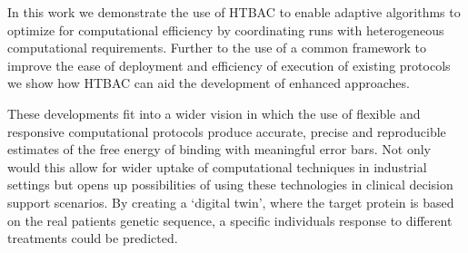 

In this work we demonstrate the use of HTBAC to enable adaptive  
algorithms to optimize for computational efficiency by coordinating runs with 
heterogeneous computational requirements.
Further to the use of a common framework to improve the ease of deployment and
efficiency of execution of existing protocols we show how HTBAC can aid the
development of enhanced approaches. 


These developments fit into a wider vision in which the use of
flexible and responsive computational protocols produce accurate,
precise and reproducible estimates of the free energy of binding with 
meaningful error bars. Not only would this allow for wider uptake of 
computational techniques in industrial settings but opens up possibilities 
of using these technologies in clinical decision support scenarios. By creating 
a `digital twin', where the target protein is based on the real patients 
genetic sequence, a specific individuals response to different 
treatments could be predicted. 

